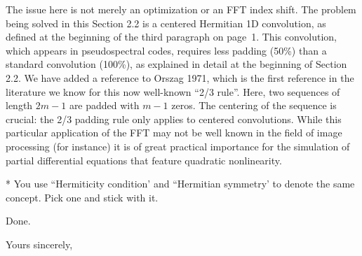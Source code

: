 \documentclass[11pt]{letter}
\begin{document}
\begin{letter}
The issue here is not merely an optimization or an FFT index shift. The problem
being solved in this Section 2.2 is a centered Hermitian 1D convolution, as
defined at the beginning of the third paragraph on page~1. This
convolution, which appears in pseudospectral codes, requires less padding
(50\%) than a standard convolution (100\%), as explained in detail at the
beginning of Section 2.2. We have added a reference to Orszag 1971, which
is the first reference in the literature we know for this now well-known ``2/3
rule''.
Here, two sequences of length $2m-1$ are padded with $m-1$ zeros.
The centering of the sequence is crucial: the 2/3 padding rule only
applies to centered convolutions. While this particular application of the
FFT may not be well known in the field of image processing (for instance) it
is of great practical importance for the simulation of partial differential
equations that feature quadratic nonlinearity.

\bq
* You use ``Hermiticity condition' and ``Hermitian symmetry' to 
 denote the same concept. Pick one and stick with it. 
\eq
 
Done.
\signature{
\vskip -1cm
\texttt{[image: signature.eps]}\\
\vskip 0.5cm
John C. Bowman\\Professor}
\closing{Yours sincerely,}
\end{letter}
\end{document}
